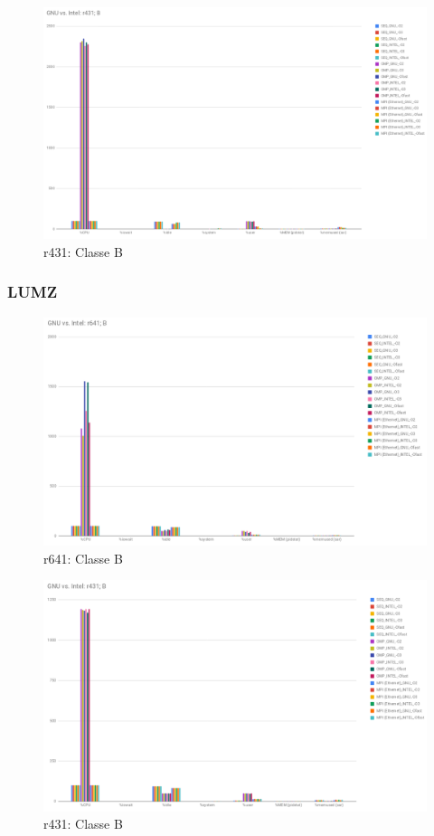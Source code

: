 \documentclass{article}
\begin{document}
\begin{appendices}
\begin{figure}[H]
    \centering
    \includegraphics[width=13cm]{Pictures/FT_GNU_Intel_r431.png}
    \caption{r431: Classe B}
    \label{fig:ft_gnu_intel_r431}
\end{figure}

\subsubsection{LUMZ}

\begin{figure}[H]
    \centering
    \includegraphics[width=13cm]{Pictures/LUMZ_GNU_Intel_r641.png}
    \caption{r641: Classe B}
    \label{fig:lumz_gnu_intel_r641}
\end{figure}

\begin{figure}[H]
    \centering
    \includegraphics[width=13cm]{Pictures/LUMZ_GNU_Intel_r431.png}
    \caption{r431: Classe B}
    \label{fig:lumz_gnu_intel_r431}
\end{figure}


\end{appendices}
\end{document}
